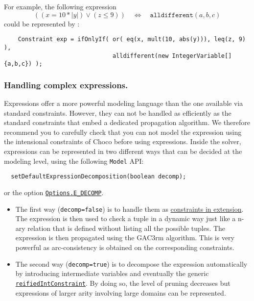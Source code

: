 For example, the following expression
$$((x = 10 * |y|) \lor (z \le 9))\quad \iff\quad \texttt{alldifferent}(a,b,c)$$
could be represented by :
\begin{lstlisting}
	Constraint exp = ifOnlyIf( or( eq(x, mult(10, abs(y))), leq(z, 9) ), 
                               alldifferent(new IntegerVariable[]{a,b,c}) );
\end{lstlisting}


\subsubsection{Handling complex expressions.}\label{model:handlingcomplexexpressions}\hypertarget{model:handlingcomplexexpressions}{}
Expressions offer a more powerful modeling language than the one available via standard constraints. However, they 
can not be handled as efficiently as the standard constraints that embed a dedicated propagation algorithm. We therefore
recommend you to carefully check that you can not model the expression using the intensional constraints of Choco before using
expressions.
Inside the solver, expressions can be represented in two different ways that can be decided at the modeling level, using the following {\tt Model} API:
\begin{lstlisting}
  setDefaultExpressionDecomposition(boolean decomp);
\end{lstlisting}
or the option \hyperlink{edecomp:edecompoptions}{\tt Options.E\_DECOMP}.
\begin{itemize}
\item The first way (\texttt{decomp=false}) is to handle them as \hyperlink{model:arbitraryconstraintsinextension}{constraints in extension}. The expression is then used to check a tuple in a dynamic way just like a n-ary relation that is defined without listing all the possible tuples. The expression is then propagated using the GAC3rm algorithm. This is very powerful as arc-consistency is obtained on the corresponding constraints.
\item The second way (\texttt{decomp=true}) is to decompose the expression automatically by introducing intermediate variables and eventually the generic \hyperlink{reifiedintconstraint:reifiedintconstraintconstraint}{\tt reifiedIntConstraint}. By doing so, the level of pruning decreases but expressions of larger arity involving large domains can be represented.
\end{itemize}

